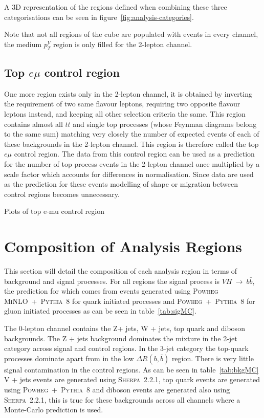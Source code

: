 A 3D representation of the regions defined when combining these three
categorisations can be seen in figure~\ref{fig:analysis-categories}.

Note that not all regions of the cube are populated with events in every channel, the medium
$p_T^V$ region is only filled for the 2-lepton channel.

\subsection{Top \texorpdfstring{$e \mu$}{e mu} control region}%
\label{sec:topemucr}

One more region exists only in the 2-lepton channel, it is obtained by inverting the
requirement of two same flavour leptons, requiring two opposite flavour leptons
instead, and keeping all other selection criteria the same. This region contains
almost all $t\bar{t}$ and single top processes (whose Feynman diagrams belong to
the same sum) matching very closely the number of expected events of each of
these backgrounds in the 2-lepton channel. This region is therefore called the
top $e \mu$ control region. The data from this control region can be used as a
prediction for the number of top process events in the 2-lepton channel once
multiplied by a scale factor which accounts for differences in normalisation.
Since data are used as the prediction for these events modelling of shape or
migration between control regions becomes unnecessary.

Plots of top e-mu control region

\section{Composition of Analysis Regions}

This section will detail the composition of each analysis region in terms of
background and signal processes. For all regions the signal process is
$VH~\rightarrow~b\bar{b}$, the prediction for which comes from events generated
using \textsc{Powheg MiNLO}~+~\textsc{Pythia~8} for quark initiated processes
and \textsc{Powheg}~+~\textsc{Pythia~8} for gluon initiated processes as can be
seen in table~\ref{tab:sigMC}.
 


The 0-lepton channel contains the  Z+ jets, W + jets, top quark and diboson
backgrounds. The Z + jets background dominates the mixture in the 2-jet category
across signal and control regions. In the 3-jet category the top-quark processes
dominate apart from in the low $\Delta R(b, \bar{b})$ region. There is very
little signal contamination in the control regions. As can be seen in
table~\ref{tab:bkgMC} V + jets events are generated using \textsc{Sherpa~2.2.1},
top quark events are generated using \textsc{Powheg}~+~\textsc{Pythia~8} and
diboson events are generated also using \textsc{Sherpa~2.2.1}, this is true for
these backgrounds across all channels where a Monte-Carlo prediction is used.

